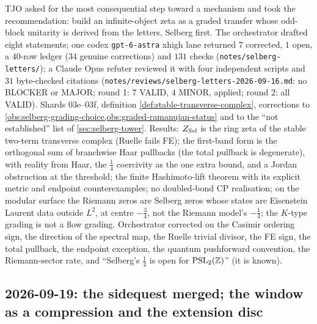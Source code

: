 TJO asked for the most consequential step toward a mechanism and took the recommendation: build an
infinite-object zeta as a graded transfer whose odd-block unitarity is derived from the letters,
Selberg first. The orchestrator drafted eight statements; one codex \texttt{gpt-6-astra} xhigh lane
returned $7$ corrected, $1$ open, a $40$-row ledger ($34$ genuine corrections) and $131$ checks
(\texttt{notes/selberg-letters/}); a Claude Opus refuter reviewed it with four independent scripts
and $31$ byte-checked citations (\texttt{notes/reviews/selberg-letters-2026-09-16.md}: no
BLOCKER or MAJOR; round 1: $7$ VALID, $4$ MINOR, applied; round 2: all VALID). Shards 03e--03f, definition
\cref{def:stable-transverse-complex}, corrections to \cref{obs:selberg-grading-choice,obs:graded-ramanujan-status}
and to the ``not established'' list of \cref{sec:selberg-tower}. Results: $Z_{\mathrm{Sel}}$ is the ring zeta
of the stable two-term transverse complex (Ruelle fails FE); the first-band form is the orthogonal
sum of branchwise Haar pullbacks (the total pullback is degenerate), with reality from Haar, the
$\tfrac14$ coercivity as the one extra bound, and a Jordan obstruction at the threshold; the finite
Hashimoto-lift theorem with its explicit metric and endpoint counterexamples; no doubled-bond CP
realisation; on the modular surface the Riemann zeros are Selberg zeros whose states are Eisenstein
Laurent data outside $L^2$, at centre $-\tfrac34$, not the Riemann model's $-\tfrac14$; the $K$-type
grading is not a flow grading. Orchestrator corrected on the Casimir ordering sign, the direction
of the spectral map, the Ruelle trivial divisor, the FE sign, the total pullback, the endpoint
exception, the quantum pushforward convention, the Riemann-sector rate, and ``Selberg's $\tfrac14$
is open for $\mathrm{PSL}_2(\mathbb Z)$'' (it is known).

\subsection*{2026-09-19: the sidequest merged; the window as a compression and the extension disc}

